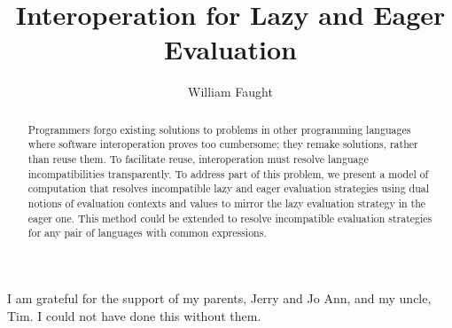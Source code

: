 \documentclass[12pt]{ucthesis}
\begin{document}
\title{Interoperation for Lazy and Eager Evaluation}
\author{William Faught}
\maketitle
\begin{frontmatter}
\copyrightpage
\approvalpage

\begin{abstract}
Programmers forgo existing solutions to problems in other programming languages where software interoperation proves too cumbersome; they remake solutions, rather than reuse them. To facilitate reuse, interoperation must resolve language incompatibilities transparently. To address part of this problem, we present a model of computation that resolves incompatible lazy and eager evaluation strategies using dual notions of evaluation contexts and values to mirror the lazy evaluation strategy in the eager one. This method could be extended to resolve incompatible evaluation strategies for any pair of languages with common expressions.
\end{abstract}

\begin{acknowledgements}
\indent\indent I am grateful for the support of my parents, Jerry and Jo Ann, and my uncle, Tim. I could not have done this without them.
\end{acknowledgements}

\tableofcontents
\listoffigures
\end{frontmatter}
\pagestyle{plain}
\renewcommand{\baselinestretch}{1.66}
\setlength{\belowcaptionskip}{12pt}







\clearpage



\end{document}
